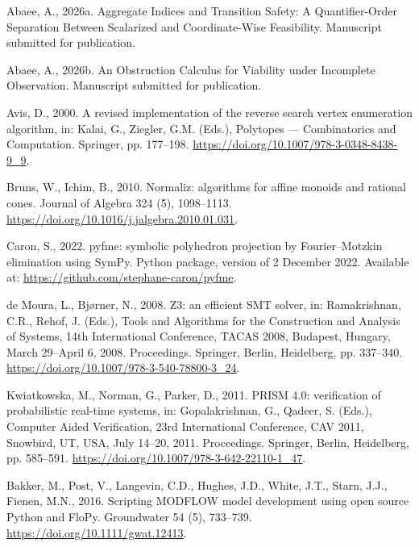 \documentclass[11pt]{article}
\begin{document}

\begin{thebibliography}{}
\providecommand{\natexlab}[1]{#1}

Abaee, A., 2026a. Aggregate Indices and Transition Safety: A Quantifier-Order
Separation Between Scalarized and Coordinate-Wise Feasibility. Manuscript
submitted for publication.

Abaee, A., 2026b. An Obstruction Calculus for Viability under Incomplete
Observation. Manuscript submitted for publication.


Avis, D., 2000. A revised implementation of the reverse search vertex
enumeration algorithm, in: Kalai, G., Ziegler, G.M. (Eds.), Polytopes ---
Combinatorics and Computation. Springer, pp. 177--198.
\url{https://doi.org/10.1007/978-3-0348-8438-9\_9}.

Bruns, W., Ichim, B., 2010. Normaliz: algorithms for affine monoids and
rational cones. Journal of Algebra 324 (5), 1098--1113.
\url{https://doi.org/10.1016/j.jalgebra.2010.01.031}.

Caron, S., 2022. pyfme: symbolic polyhedron projection by Fourier--Motzkin
elimination using SymPy. Python package, version of 2 December 2022.
Available at: \url{https://github.com/stephane-caron/pyfme}.

de Moura, L., Bj{\o}rner, N., 2008. Z3: an efficient SMT solver, in:
Ramakrishnan, C.R., Rehof, J. (Eds.), Tools and Algorithms for the
Construction and Analysis of Systems, 14th International Conference, TACAS
2008, Budapest, Hungary, March 29--April 6, 2008. Proceedings. Springer,
Berlin, Heidelberg, pp. 337--340.
\url{https://doi.org/10.1007/978-3-540-78800-3\_24}.

Kwiatkowska, M., Norman, G., Parker, D., 2011. PRISM 4.0: verification of
probabilistic real-time systems, in: Gopalakrishnan, G., Qadeer, S. (Eds.),
Computer Aided Verification, 23rd International Conference, CAV 2011,
Snowbird, UT, USA, July 14--20, 2011. Proceedings. Springer, Berlin,
Heidelberg, pp. 585--591. \url{https://doi.org/10.1007/978-3-642-22110-1\_47}.

Bakker, M., Post, V., Langevin, C.D., Hughes, J.D., White, J.T., Starn,
J.J., Fienen, M.N., 2016. Scripting MODFLOW model development using open
source Python and FloPy. Groundwater 54 (5), 733--739.
\url{https://doi.org/10.1111/gwat.12413}.


\end{thebibliography}
\end{document}
